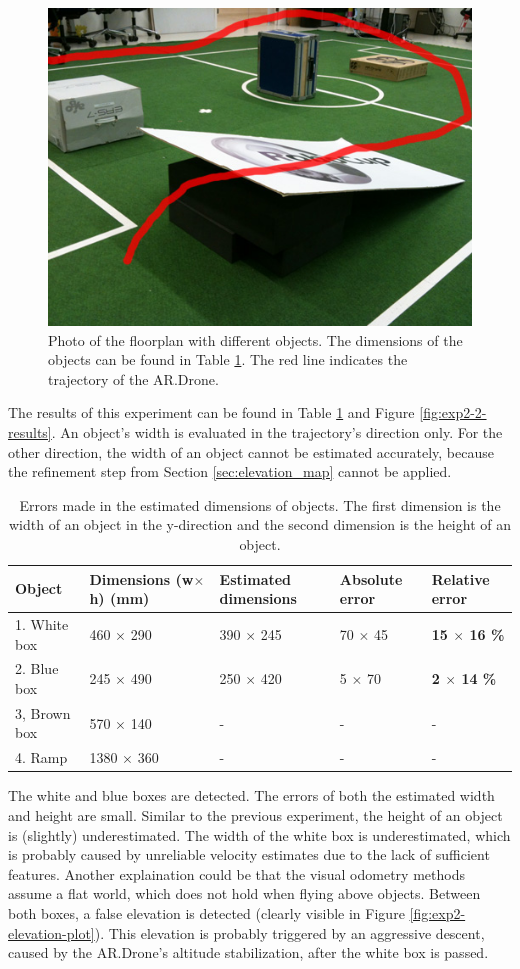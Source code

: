 \begin{figure}[htb!]
\centering
\includegraphics[width=0.4\linewidth]{images/exp2-elevation-setup.jpg}
\caption{Photo of the floorplan with different objects. The dimensions of the objects can be found in Table \ref{tab:exp2}. The red line indicates the trajectory of the AR.Drone.}
\label{fig:exp2-setup}
\end{figure}

The results of this experiment can be found in Table \ref{tab:exp2} and Figure \ref{fig:exp2-2-results}.
An object's width is evaluated in the trajectory's direction only. 
For the other direction, the width of an object cannot be estimated accurately, because the refinement step from Section \ref{sec:elevation_map} cannot be applied.


\begin{table}[htb!]
    \centering
    \begin{tabular}
        { | l | l | l | l | l | } 
	\hline
	Object & Dimensions (w$\times$h) (\small{mm}) & Estimated dimensions & Absolute error & Relative error \\
        \hline
        1. White box	& 460 $\times$ 290	& 390 $\times$ 245	& 70 $\times$ 45	& \textbf{15 $\times$ 16 \%}\\
	2. Blue box	& 245 $\times$ 490	& 250 $\times$ 420	& 5 $\times$ 70	& \textbf{2 $\times$ 14 \%}\\
	3, Brown box	& 570 $\times$ 140	& - 					& - 				& - \\
	4. Ramp		& 1380 $\times$ 360	& - 					& - 				& - \\
	\hline
    \end{tabular}
    \caption{Errors made in the estimated dimensions of objects. The first dimension is the width of an object in the y-direction and the second dimension is the height of an object. }
    \label{tab:exp2}
\end{table}

The white and blue boxes are detected.
The errors of both the estimated width and height are small.
Similar to the previous experiment, the height of an object is (slightly) underestimated.
The width of the white box is underestimated, which is probably caused by unreliable velocity estimates due to the lack of sufficient features.
Another explaination could be that the visual odometry methods assume a flat world, which does not hold when flying above objects.
Between both boxes, a false elevation is detected (clearly visible in Figure \ref{fig:exp2-elevation-plot}).
This elevation is probably triggered by an aggressive descent, caused by the AR.Drone's altitude stabilization, after the white box is passed.

